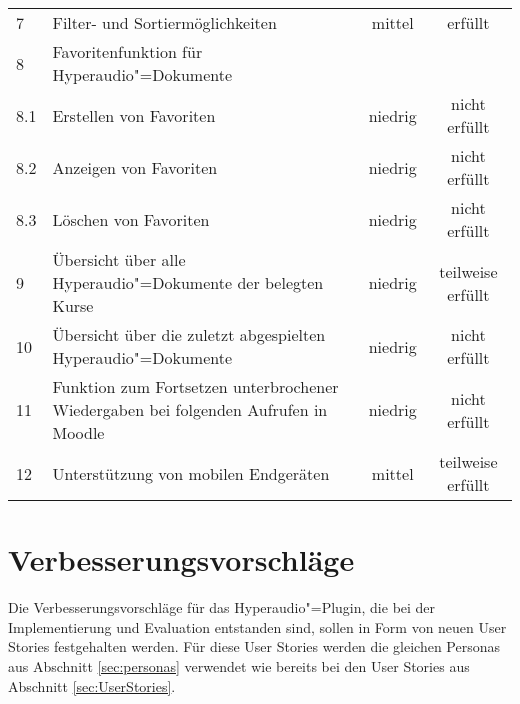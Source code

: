 \begin{table}[!ht]
\begin{tabularx}{\textwidth}{lXcc}
   	7 & Filter- und Sortiermöglichkeiten & mittel & erfüllt\\
    8 & Favoritenfunktion für Hyperaudio"=Dokumente & & \\
    8.1 & \hspace*{0.5cm} Erstellen von Favoriten & niedrig & nicht erfüllt\\
    8.2 & \hspace*{0.5cm} Anzeigen von Favoriten & niedrig & nicht erfüllt\\
    8.3 & \hspace*{0.5cm} Löschen von Favoriten & niedrig & nicht erfüllt\\    
    9 & Übersicht über alle Hyperaudio"=Dokumente der belegten Kurse & niedrig & teilweise erfüllt\\
    10 & Übersicht über die zuletzt abgespielten Hyperaudio"=Dokumente & niedrig & nicht erfüllt\\
    11 &  Funktion zum Fortsetzen unterbrochener Wiedergaben bei folgenden Aufrufen in Moodle & niedrig & nicht erfüllt\\
    12 & Unterstützung von mobilen Endgeräten & mittel & teilweise erfüllt\\
    \hline
\end{tabularx}
\end{table}
\FloatBarrier
\section{Verbesserungsvorschläge}
\label{sec:Verbesserungsvorschlaege}
Die Verbesserungsvorschläge für das Hyperaudio"=Plugin, die bei der Implementierung und Evaluation entstanden sind,  sollen in Form von neuen User Stories festgehalten werden. Für diese User Stories werden die gleichen Personas aus Abschnitt \ref{sec:personas} verwendet wie bereits bei den User Stories aus Abschnitt \ref{sec:UserStories}.

